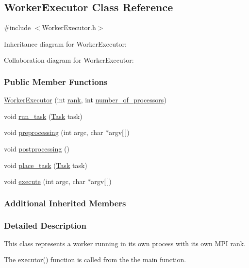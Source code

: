 \hypertarget{a00096}{}\subsection{Worker\+Executor Class Reference}
\label{a00096}


{\ttfamily \#include $<$Worker\+Executor.\+h$>$}



Inheritance diagram for Worker\+Executor\+:


Collaboration diagram for Worker\+Executor\+:
\subsubsection*{Public Member Functions}
\begin{DoxyCompactItemize}
\item 
\hyperlink{a00096_aae5a80d4f64f2bc795b175697e15225f}{Worker\+Executor} (int \hyperlink{a00027_a33c24e2887b4d9c4ef7f3566d3bc803e}{rank}, int \hyperlink{a00027_a4e798bde66d26fe200de7e8d2b54e915}{number\+\_\+of\+\_\+processors})
\item 
void \hyperlink{a00096_a7edee52a5d96dea5da7dc0e0ba461b45}{run\+\_\+task} (\hyperlink{a00002}{Task} task)
\item 
void \hyperlink{a00096_ac3155d06d7807a1d9d305293b92d63ab}{preprocessing} (int argc, char $\ast$argv\mbox{[}$\,$\mbox{]})
\item 
void \hyperlink{a00096_aff4c1b156960d031d09e669014038cd5}{postprocessing} ()
\item 
void \hyperlink{a00096_a50f9307b592bb371535e00461d7d0133}{place\+\_\+task} (\hyperlink{a00002}{Task} task)
\item 
void \hyperlink{a00096_adb37338d137f4039d835519b14698d51}{execute} (int argc, char $\ast$argv\mbox{[}$\,$\mbox{]})
\end{DoxyCompactItemize}
\subsubsection*{Additional Inherited Members}


\subsubsection{Detailed Description}
This class represents a worker running in its own process with its own M\+P\+I rank.

The executor() function is called from the the main function.

